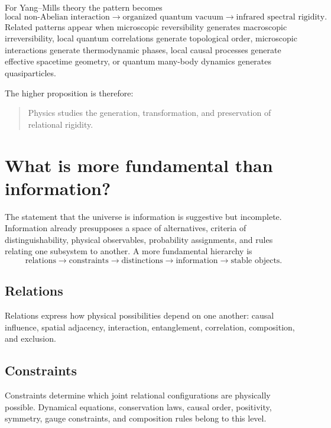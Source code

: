 \documentclass[11pt]{article}
\begin{document}
For Yang--Mills theory the pattern becomes
\begin{equation}
  \text{local non-Abelian interaction}
  \longrightarrow
  \text{organized quantum vacuum}
  \longrightarrow
  \text{infrared spectral rigidity}.
  \label{eq:ym-pattern}
\end{equation}
Related patterns appear when microscopic reversibility generates macroscopic
irreversibility, local quantum correlations generate topological order,
microscopic interactions generate thermodynamic phases, local causal processes
generate effective spacetime geometry, or quantum many-body dynamics generates
quasiparticles.

The higher proposition is therefore:
\begin{quote}
Physics studies the generation, transformation, and preservation of relational
rigidity.
\end{quote}

\section{What is more fundamental than information?}

The statement that the universe is information is suggestive but incomplete.
Information already presupposes a space of alternatives, criteria of
distinguishability, physical observables, probability assignments, and rules
relating one subsystem to another.  A more fundamental hierarchy is
\begin{equation}
\boxed{
\text{relations}
\longrightarrow
\text{constraints}
\longrightarrow
\text{distinctions}
\longrightarrow
\text{information}
\longrightarrow
\text{stable objects}.}
\label{eq:ontological-hierarchy}
\end{equation}

\subsection{Relations}

Relations express how physical possibilities depend on one another: causal
influence, spatial adjacency, interaction, entanglement, correlation,
composition, and exclusion.

\subsection{Constraints}

Constraints determine which joint relational configurations are physically
possible.  Dynamical equations, conservation laws, causal order, positivity,
symmetry, gauge constraints, and composition rules belong to this level.
\end{document}
